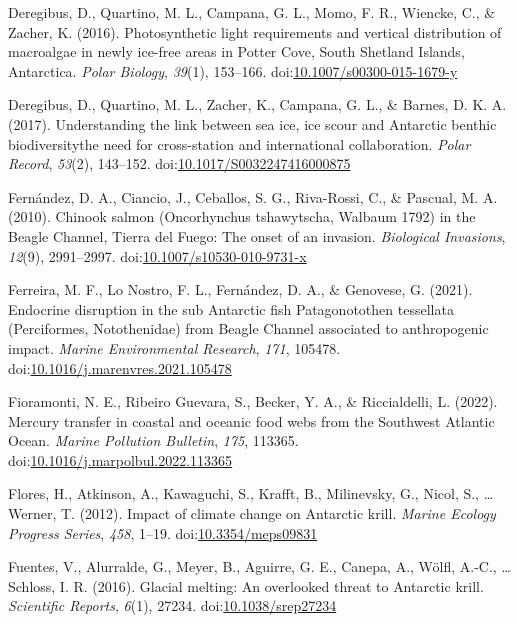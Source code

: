 \documentclass[
]{article}
\newlength{\cslhangindent}
\newenvironment{CSLReferences}[2] %
 {\begin{list}{}{%
  \setlength{\itemindent}{0pt}
  \setlength{\leftmargin}{0pt}
  \setlength{\parsep}{0pt}
  \ifodd #1
   \setlength{\leftmargin}{\cslhangindent}
   \setlength{\itemindent}{-1\cslhangindent}
  \fi
  \setlength{\itemsep}{#2\baselineskip}}}
 {\end{list}}
\begin{document}
\begin{CSLReferences}{1}{0}
Deregibus, D., Quartino, M. L., Campana, G. L., Momo, F. R., Wiencke,
C., \& Zacher, K. (2016). Photosynthetic light requirements and vertical
distribution of macroalgae in newly ice-free areas in {Potter Cove},
{South Shetland Islands}, {Antarctica}. \emph{Polar Biology},
\emph{39}(1), 153--166.
doi:\href{https://doi.org/10.1007/s00300-015-1679-y}{10.1007/s00300-015-1679-y}

Deregibus, D., Quartino, M. L., Zacher, K., Campana, G. L., \& Barnes,
D. K. A. (2017). Understanding the link between sea ice, ice scour and
{Antarctic} benthic biodiversity\textendash the need for cross-station
and international collaboration. \emph{Polar Record}, \emph{53}(2),
143--152.
doi:\href{https://doi.org/10.1017/S0032247416000875}{10.1017/S0032247416000875}

Fernández, D. A., Ciancio, J., Ceballos, S. G., Riva-Rossi, C., \&
Pascual, M. A. (2010). Chinook salmon ({Oncorhynchus} tshawytscha,
{Walbaum} 1792) in the {Beagle Channel}, {Tierra} del {Fuego}: The onset
of an invasion. \emph{Biological Invasions}, \emph{12}(9), 2991--2997.
doi:\href{https://doi.org/10.1007/s10530-010-9731-x}{10.1007/s10530-010-9731-x}

Ferreira, M. F., Lo Nostro, F. L., Fernández, D. A., \& Genovese, G.
(2021). Endocrine disruption in the sub {Antarctic} fish
{Patagonotothen} tessellata ({Perciformes}, {Notothenidae}) from {Beagle
Channel} associated to anthropogenic impact. \emph{Marine Environmental
Research}, \emph{171}, 105478.
doi:\href{https://doi.org/10.1016/j.marenvres.2021.105478}{10.1016/j.marenvres.2021.105478}

Fioramonti, N. E., Ribeiro Guevara, S., Becker, Y. A., \& Riccialdelli,
L. (2022). Mercury transfer in coastal and oceanic food webs from the
{Southwest Atlantic Ocean}. \emph{Marine Pollution Bulletin},
\emph{175}, 113365.
doi:\href{https://doi.org/10.1016/j.marpolbul.2022.113365}{10.1016/j.marpolbul.2022.113365}

Flores, H., Atkinson, A., Kawaguchi, S., Krafft, B., Milinevsky, G.,
Nicol, S., \ldots{} Werner, T. (2012). Impact of climate change on
{Antarctic} krill. \emph{Marine Ecology Progress Series}, \emph{458},
1--19. doi:\href{https://doi.org/10.3354/meps09831}{10.3354/meps09831}

Fuentes, V., Alurralde, G., Meyer, B., Aguirre, G. E., Canepa, A.,
Wölfl, A.-C., \ldots{} Schloss, I. R. (2016). Glacial melting: An
overlooked threat to {Antarctic} krill. \emph{Scientific Reports},
\emph{6}(1), 27234.
doi:\href{https://doi.org/10.1038/srep27234}{10.1038/srep27234}


\end{CSLReferences}
\end{document}
